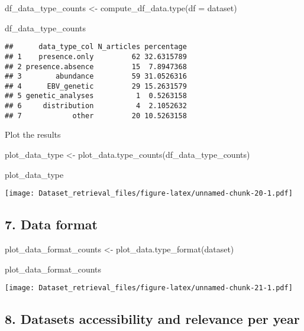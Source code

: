\documentclass[
]{article}
\newenvironment{Shaded}{\begin{snugshade}}{\end{snugshade}}
\newcommand{\AttributeTok}[1]{\textcolor[rgb]{0.77,0.63,0.00}{#1}}
\newcommand{\FunctionTok}[1]{\textcolor[rgb]{0.00,0.00,0.00}{#1}}
\newcommand{\NormalTok}[1]{#1}
\newcommand{\OtherTok}[1]{\textcolor[rgb]{0.56,0.35,0.01}{#1}}
\begin{document}
\begin{Shaded}
\begin{Highlighting}[]
\NormalTok{df\_data\_type\_counts }\OtherTok{\textless{}{-}} \FunctionTok{compute\_df\_data.type}\NormalTok{(}\AttributeTok{df =}\NormalTok{ dataset)}

\NormalTok{df\_data\_type\_counts}
\end{Highlighting}
\end{Shaded}

\begin{verbatim}
##      data_type_col N_articles percentage
## 1    presence.only         62 32.6315789
## 2 presence.absence         15  7.8947368
## 3        abundance         59 31.0526316
## 4      EBV_genetic         29 15.2631579
## 5 genetic_analyses          1  0.5263158
## 6     distribution          4  2.1052632
## 7            other         20 10.5263158
\end{verbatim}

Plot the results

\begin{Shaded}
\begin{Highlighting}[]
\NormalTok{plot\_data\_type }\OtherTok{\textless{}{-}} \FunctionTok{plot\_data.type\_counts}\NormalTok{(df\_data\_type\_counts)}

\NormalTok{plot\_data\_type}
\end{Highlighting}
\end{Shaded}

\texttt{[image: Dataset\_retrieval\_files/figure-latex/unnamed-chunk-20-1.pdf]}

\hypertarget{data-format}{%
\subsection{7. Data format}\label{data-format}}

\begin{Shaded}
\begin{Highlighting}[]
\NormalTok{plot\_data\_format\_counts }\OtherTok{\textless{}{-}} \FunctionTok{plot\_data.type\_format}\NormalTok{(dataset)}

\NormalTok{plot\_data\_format\_counts}
\end{Highlighting}
\end{Shaded}

\texttt{[image: Dataset\_retrieval\_files/figure-latex/unnamed-chunk-21-1.pdf]}

\hypertarget{datasets-accessibility-and-relevance-per-year}{%
\subsection{8. Datasets accessibility and relevance per
year}\label{datasets-accessibility-and-relevance-per-year}}
\end{document}
